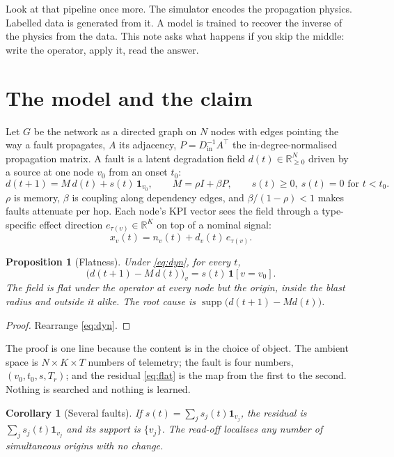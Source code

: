 \documentclass[11pt,a4paper]{article}
\newtheorem{proposition}{Proposition}
\newtheorem{corollary}{Corollary}
\newcommand{\R}{\mathbb{R}}
\newcommand{\ind}[1]{\mathbf{1}\!\left[#1\right]}
\newcommand{\supp}{\operatorname{supp}}
\begin{document}
Look at that pipeline once more. The simulator encodes the propagation physics. Labelled data is
generated from it. A model is trained to recover the inverse of the physics from the data. This
note asks what happens if you skip the middle: write the operator, apply it, read the answer.

\section{The model and the claim}
Let $G$ be the network as a directed graph on $N$ nodes with edges pointing the way a fault
propagates, $A$ its adjacency, $P=D_{\mathrm{in}}^{-1}A^{\top}$ the in-degree-normalised
propagation matrix. A fault is a latent degradation field $d(t)\in\R^N_{\ge0}$ driven by a source
at one node $v_0$ from an onset $t_0$:
\begin{equation}
d(t{+}1)=M\,d(t)+s(t)\,\mathbf 1_{v_0},\qquad M=\rho I+\beta P,\qquad s(t)\ge0,\ s(t)=0\text{ for }t<t_0.
\label{eq:dyn}
\end{equation}
$\rho$ is memory, $\beta$ is coupling along dependency edges, and $\beta/(1-\rho)<1$ makes faults
attenuate per hop. Each node's KPI vector sees the field through a type-specific effect direction
$e_{\tau(v)}\in\R^K$ on top of a nominal signal:
\begin{equation}
x_v(t)=n_v(t)+d_v(t)\,e_{\tau(v)}.
\label{eq:obs}
\end{equation}

\begin{proposition}[Flatness]
Under \eqref{eq:dyn}, for every $t$,
\begin{equation}
\big(d(t{+}1)-M\,d(t)\big)_v=s(t)\,\ind{v=v_0}.
\label{eq:flat}
\end{equation}
The field is \emph{flat} under the operator at every node but the origin, inside the blast radius
and outside it alike. The root cause is $\supp\big(d(t{+}1)-Md(t)\big)$.
\end{proposition}
\begin{proof}
Rearrange \eqref{eq:dyn}.
\end{proof}
The proof is one line because the content is in the choice of object. The ambient space is
$N\times K\times T$ numbers of telemetry; the fault is four numbers, $(v_0,t_0,s,T_r)$; and the
residual \eqref{eq:flat} is the map from the first to the second. Nothing is searched and nothing
is learned.

\begin{corollary}[Several faults]
If $s(t)=\sum_j s_j(t)\mathbf 1_{v_j}$, the residual is $\sum_j s_j(t)\mathbf 1_{v_j}$ and its
support is $\{v_j\}$. The read-off localises any number of simultaneous origins with no change.
\end{corollary}
\end{document}
